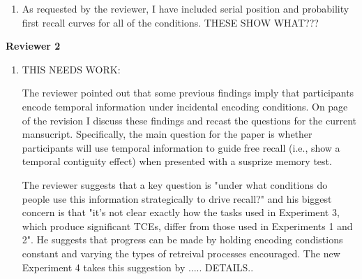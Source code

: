 \documentclass[12pt]{article}
\begin{document}
\begin{enumerate}
\item
	As requested by the reviewer, I have included serial position and probability first recall curves for all of the conditions. THESE SHOW WHAT??? \pageref{TODO-7}



\end{enumerate}


\vspace{20pt}

\textbf{\large{Reviewer 2}}

\begin{enumerate}

	\item 
	THIS NEEDS WORK:

	The reviewer pointed out that some previous findings imply that participants encode temporal information under incidental encoding conditions. On page \pageref{TODO-8} of the revision I discuss these findings and recast the questions for the current mansucript. Specifically, the main question for the paper is whether participants will use temporal information to guide free recall (i.e., show a temporal contiguity effect) when presented with a susprize memory test.

	The reviewer suggests that a key question is "under what conditions do people use this information strategically to drive recall?" and his biggest concern is that "it's not clear exactly how the tasks used in Experiment 3, which produce significant TCEs, differ from those used in Experiments 1 and 2". He suggests that progress can be made by holding encoding condistions constant and varying the types of retreival processes encouraged. The new Experiment 4 takes this suggestion by ..... DETAILS..


\end{enumerate}
\end{document}
